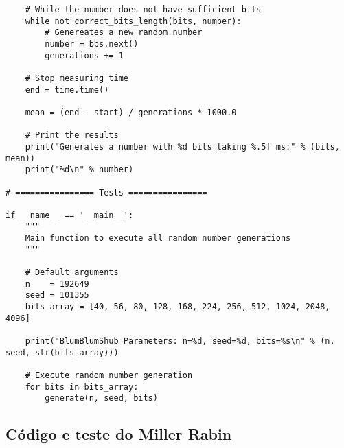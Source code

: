 \documentclass{article}
\begin{document}
\begin{lstlisting}
	# While the number does not have sufficient bits
	while not correct_bits_length(bits, number):
		# Genereates a new random number
		number = bbs.next()
		generations += 1
	
	# Stop measuring time
	end = time.time()

	mean = (end - start) / generations * 1000.0

	# Print the results
	print("Generates a number with %d bits taking %.5f ms:" % (bits, mean))
	print("%d\n" % number)

# ================ Tests ================

if __name__ == '__main__':
	"""
	Main function to execute all random number generations
    """

	# Default arguments
	n    = 192649
	seed = 101355
	bits_array = [40, 56, 80, 128, 168, 224, 256, 512, 1024, 2048, 4096]

	print("BlumBlumShub Parameters: n=%d, seed=%d, bits=%s\n" % (n, seed, str(bits_array)))

	# Execute random number generation
	for bits in bits_array:
		generate(n, seed, bits)
\end{lstlisting}

\pagebreak

\subsection{Código e teste do Miller Rabin}
\label{miller-rabin-full}
\end{document}

